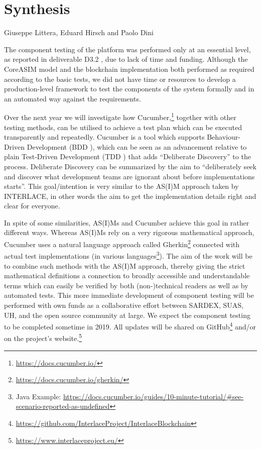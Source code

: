 \chapter{Synthesis}

\vspace{-1cm}
\begin{center}
Giuseppe Littera, Eduard Hirsch and Paolo Dini
\end{center}

The component testing of the platform was performed only at an essential level, as reported in deliverable D3.2 \cite{INTERLACE_D32}, due to lack of time and funding. Although the CoreASIM model and the blockchain implementation both performed as required according to the basic tests, we did not have time or resources to develop a production-level framework to test the components of the system formally and in an automated way against the requirements.

Over the next year we will investigate how Cucumber,\footnote{\url{https://docs.cucumber.io/}} together with other testing methods, can be utilised to achieve a test plan which can be executed transparently and repeatedly. Cucumber is a tool which supports Behaviour-Driven Development (BDD \cite{wynne2017cucumber}), which can be seen as an advancement relative to plain Test-Driven Development (TDD \cite{beck2003test}) that adds ``Deliberate Discovery'' to the process. Deliberate Discovery can be summarized by the aim to ``deliberately seek and discover what development teams are ignorant about before implementations starts''. This goal/intention is very similar to the AS(I)M approach taken by INTERLACE, in other words the aim to get the implementation details right and clear for everyone.

In spite of some similarities, AS(I)Ms and Cucumber achieve this goal in rather different ways. Whereas AS(I)Ms rely on a very rigorous mathematical approach, Cucumber uses a natural language approach called Gherkin\footnote{\url{https://docs.cucumber.io/gherkin/}} connected with actual test implementations (in various languages\footnote{Java Example: \url{https://docs.cucumber.io/guides/10-minute-tutorial/\#see-scenario-reported-as-undefined}}). The aim of the work will be to combine such methods with the AS(I)M approach, thereby giving the strict mathematical definitions a connection to broadly accessible and understandable terms which can easily be verified by both (non-)technical readers as well as by automated tests. This more immediate development of component testing will be performed with own funds as a collaborative effort between SARDEX, SUAS, UH, and the open source community at large. We expect the component testing to be completed sometime in 2019. All updates will be shared on GitHub\footnote{\url{https://github.com/InterlaceProject/InterlaceBlockchain}} and/or on the project's website.\footnote{\url{https://www.interlaceproject.eu/}}


